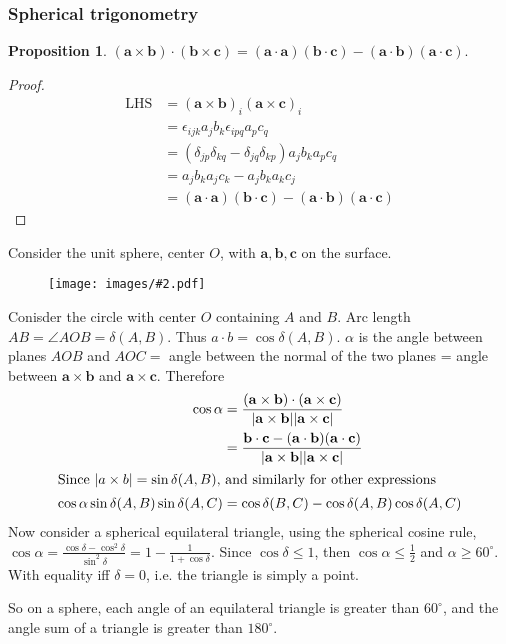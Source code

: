\documentclass[a4paper]{article}
\theoremstyle{definition}
\newtheorem*{prop}{Proposition}
\newcommand{\mb}[1]{\mathbf{#1}}
\newcommand{\img}[2][]{\begin{figure}[ht]\centering\texttt{[image: images/\#2.pdf]}\end{figure}}
\begin{document}
\subsubsection{Spherical trigonometry}
\begin{prop}
  $\mb{(a\times b)\cdot (b\times c) = (a\cdot a)(b\cdot c) - (a\cdot b)(a\cdot c)}$.
\end{prop}
\begin{proof}
  \begin{align*}
    \text{LHS} &= (\mb{a\times b})_i(\mb{a\times c})_i\\
    &= \epsilon_{ijk}a_jb_k\epsilon_{ipq} a_pc_q\\
    &= (\delta_{jp}\delta_{kq} - \delta_{jq}\delta_{kp})a_jb_ka_pc_q\\
    &= a_jb_k a_jc_k - a_j b_k a_k c_j\\
    &= \mb{(a\cdot a)(b\cdot c) - (a\cdot b)(a\cdot c)}
  \end{align*}
\end{proof}

Consider the unit sphere, center $O$, with $\mb{a, b, c}$ on the surface.

\img{vm_2}

Conisder the circle with center $O$ containing $A$ and $B$. Arc length $AB = \angle AOB = \delta(A, B)$. Thus $a\cdot b = \cos \delta(A, B)$. $\alpha$ is the angle between planes $AOB$ and $AOC = $ angle between the normal of the two planes = angle between $\mb{a\times b}$ and $\mb{a \times c}$. Therefore
\begin{align*}
  \cos \alpha &= \mb{\frac{(a\times b)\cdot(a\times c)}{|a\times b||a\times c|}}\\
  &= \mb{\frac{b\cdot c - (a\cdot b)(a\cdot c)}{|a\times b||a\times c|}}\\
\intertext{Since $|a\times b| = \sin\delta(A, B)$, and similarly for other expressions}
  \cos\alpha\sin\delta(A, B)\sin\delta(A, C) &= \cos\delta(B, C) - \cos\delta(A, B)\cos\delta(A, C)
\end{align*}
Now consider a spherical equilateral triangle, using the spherical cosine rule, $\cos\alpha = \frac{\cos\delta - \cos^2\delta}{\sin^2\delta} = 1 - \frac{1}{1 + \cos\delta}$. Since $\cos\delta\leq 1$, then $\cos\alpha\leq \frac{1}{2}$ and $\alpha \geq 60^\circ$. With equality iff $\delta = 0$, i.e. the triangle is simply a point.

So on a sphere, each angle of an equilateral triangle is greater than $60^\circ$, and the angle sum of a triangle is greater than $180^\circ$.
\end{document}
